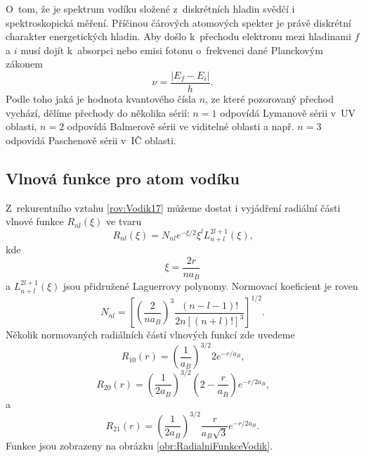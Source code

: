 O~tom, že je spektrum vodíku složené z~diskrétních hladin svědčí i spektroskopická měření. Příčinou čárových atomových spekter je právě diskrétní charakter energetických hladin. Aby došlo k~přechodu elektronu mezi hladinami $f$ a $i$ musí dojít k~absorpci nebo emisi fotonu o~frekvenci dané Planckovým zákonem
\begin{equation}
\nu = \frac{|E_f-E_i|}{h} \mbox{.}
\label{rov:Vodik26}
\end{equation}
Podle toho jaká je hodnota kvantového čísla $n$, ze které pozorovaný přechod vychází, dělíme přechody do několika sérií: $n=1$ odpovídá Lymanově sérii v~UV oblasti, $n=2$ odpovídá Balmerově sérii ve viditelné oblasti a např. $n=3$ odpovídá Paschenově sérii v~IČ oblasti.

\subsection{Vlnová funkce pro atom vodíku}
\label{kap:VlnovaFunkceVodik}

Z~rekurentního vztahu \eqref{rov:Vodik17} můžeme dostat i vyjádření radiální části vlnové funkce $R_{nl}(\xi)$ ve tvaru
\begin{equation}
R_{nl}(\xi) = N_{nl} e^{-\xi/2}\xi^l L_{n+l}^{2l+1}(\xi) \mbox{,}
\label{rov:Vodik27}
\end{equation}
kde
\begin{equation}
\xi = \frac{2r}{n a_B}
\label{rov:Vodik28}
\end{equation}
a $L_{n+l}^{2l+1}(\xi)$ jsou přidružené Laguerrovy polynomy. Normovací koeficient je roven
\begin{equation}
N_{nl} = \left[ \left( \frac{2}{n a_B} \right)^3 \frac{(n-l-1)!}{2n[(n+l)!]^3}\right]^{1/2} \mbox{.}
\label{rov:Vodik29}
\end{equation}
Několik normovaných radiálních částí vlnových funkcí zde uvedeme
\begin{equation}
R_{10}(r) = \left( \frac{1}{a_B}\right) ^{3/2} 2 e^{-r/a_B} \mbox{,}
\end{equation}
\begin{equation}
R_{20}(r) = \left( \frac{1}{2a_B}\right) ^{3/2} \left(2-\frac{r}{a_B}\right) e^{-r/2a_B} \mbox{,}
\end{equation}
a
\begin{equation}
R_{21}(r) = \left( \frac{1}{2a_B}\right) ^{3/2} \frac{r}{a_B \sqrt{3}} e^{-r/2a_B} \mbox{.}
\end{equation}
Funkce jsou zobrazeny na obrázku \ref{obr:RadialniFunkceVodik}.

